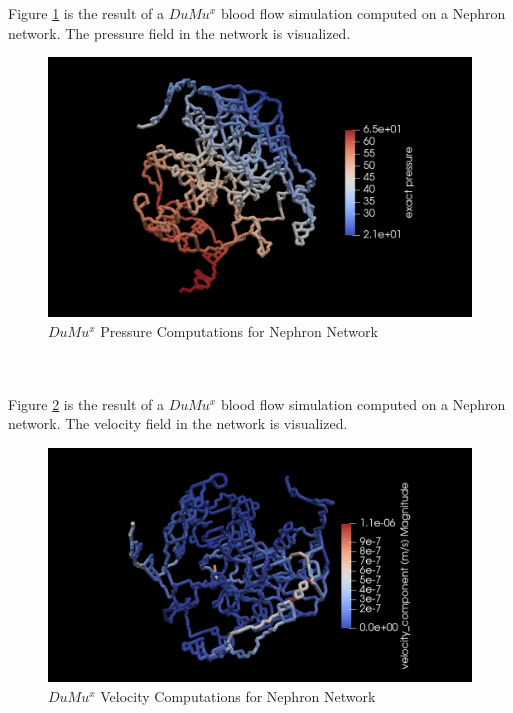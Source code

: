 Figure \ref{fig:nephron2_pressure}  is the result of a $DuMu^x$ blood flow simulation computed on a Nephron network. The pressure field in the network is visualized.\\
\begin{figure}[h]
\centering
\includegraphics[width=162mm]{nephron2_pressure}
\caption{\footnotesize $DuMu^x$ Pressure Computations for Nephron Network}
\label{fig:nephron2_pressure}
\end{figure}\\
%
\\Figure \ref{fig:nephron2_velocity}  is the result of a $DuMu^x$ blood flow simulation computed on a Nephron network. The velocity field in the network is visualized.\\
\begin{figure}[h]
\centering
\includegraphics[width=162mm]{nephron2_velocity}
\caption{\footnotesize $DuMu^x$ Velocity Computations for Nephron Network}
\label{fig:nephron2_velocity}
\end{figure}\\\\

